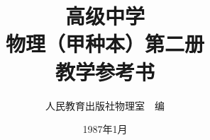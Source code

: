 \documentclass[a4paper, openany]{ctexbook}
\theoremstyle{plain}
\begin{document}
\fontsize{11}{14}\selectfont














\title{高级中学\\物理（甲种本）第二册\\教学参考书}



\author{人民教育出版社物理室~~编}
\date{1987年1月}

\maketitle

\dominitoc

\tableofcontents


\frontmatter



\mainmatter











\end{document}
